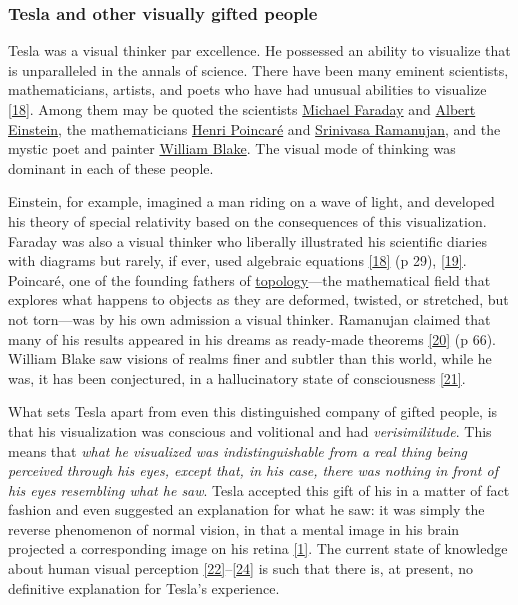 \documentclass[
  12pt,
  british,
  a4paper,
  rgb,
  dvipsnames,
  svgnames,
  hyphens]{article}
\begin{document}
\hypertarget{tesla-and-other-visually-gifted-people}{%
\subsubsection{Tesla and other visually gifted
people}\label{tesla-and-other-visually-gifted-people}}

Tesla was a visual thinker par excellence. He possessed an ability to
visualize that is unparalleled in the annals of science. There have been
many eminent scientists, mathematicians, artists, and poets who have had
unusual abilities to visualize \protect\hyperlink{ref-west91}{{[}18{]}}.
Among them may be quoted the scientists
\href{https://en.wikipedia.org/wiki/Michael_Faraday}{Michael Faraday}
and \href{https://en.wikipedia.org/wiki/Albert_Einstein}{Albert
Einstein}, the mathematicians
\href{https://en.wikipedia.org/wiki/Henri_Poincar\%C3\%A9}{Henri
Poincaré} and
\href{https://en.wikipedia.org/wiki/Srinivasa_Ramanujan}{Srinivasa
Ramanujan}, and the mystic poet and painter
\href{https://en.wikipedia.org/wiki/William_Blake}{William Blake}. The
visual mode of thinking was dominant in each of these people.

Einstein, for example, imagined a man riding on a wave of light, and
developed his theory of special relativity based on the consequences of
this visualization. Faraday was also a visual thinker who liberally
illustrated his scientific diaries with diagrams but rarely, if ever,
used algebraic equations \protect\hyperlink{ref-west91}{{[}18{]}} (p
29), \protect\hyperlink{ref-koestler64}{{[}19{]}}. Poincaré, one of the
founding fathers of
\href{https://mathworld.wolfram.com/Topology.html}{topology}---the
mathematical field that explores what happens to objects as they are
deformed, twisted, or stretched, but not torn---was by his own admission
a visual thinker. Ramanujan claimed that many of his results appeared in
his dreams as ready-made theorems
\protect\hyperlink{ref-kanigel91}{{[}20{]}} (p 66). William Blake saw
visions of realms finer and subtler than this world, while he was, it
has been conjectured, in a hallucinatory state of consciousness
\protect\hyperlink{ref-mckim72}{{[}21{]}}.

What sets Tesla apart from even this distinguished company of gifted
people, is that his visualization was conscious and volitional and had
\emph{verisimilitude}. This means that \emph{what he visualized was
indistinguishable from a real thing being perceived through his eyes,
except that, in his case, there was nothing in front of his eyes
resembling what he saw}. Tesla accepted this gift of his in a matter of
fact fashion and even suggested an explanation for what he saw: it was
simply the reverse phenomenon of normal vision, in that a mental image
in his brain projected a corresponding image on his retina
\protect\hyperlink{ref-john83}{{[}1{]}}. The current state of knowledge
about human visual perception
\protect\hyperlink{ref-hubel88}{{[}22{]}}--\protect\hyperlink{ref-pvi97}{{[}24{]}}
is such that there is, at present, no definitive explanation for Tesla's
experience.
\end{document}
